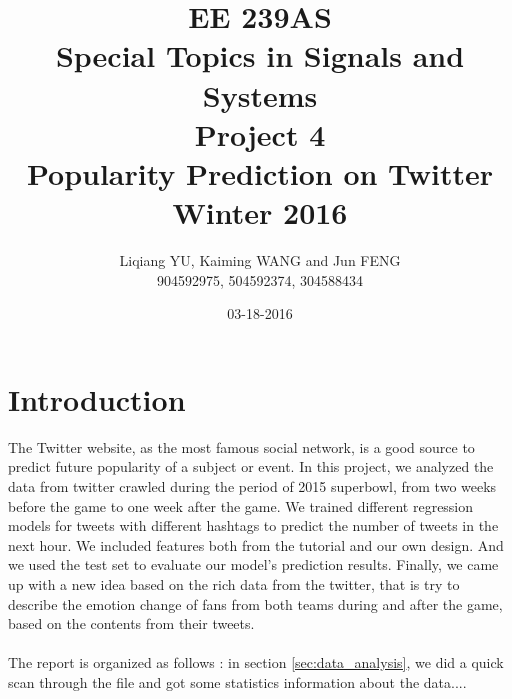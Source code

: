 \documentclass{article}
\begin{document}
\begin{titlepage}
\title{EE 239AS \\Special Topics in Signals and Systems\\Project 4\\Popularity Prediction on Twitter\\Winter 2016} 
\author{Liqiang YU, Kaiming WANG and Jun FENG\\
904592975, 504592374, 304588434} 
\date{03-18-2016}
\end{titlepage}

\maketitle
\newpage
\tableofcontents
\newpage

\section{Introduction}
The Twitter website, as the most famous social network, is a good source to predict future popularity of a subject or event. In this project, we analyzed the data from twitter crawled during the period of 2015 superbowl, from two weeks before the game to one week after the game. We trained different regression models for tweets with different hashtags to predict the number of tweets in the next hour. We included features both from the tutorial and our own design. And we used the test set to evaluate our model's prediction results. Finally, we came up with a new idea based on the rich data from the twitter, that is try to describe the emotion change of fans from both teams during and after the game, based on the contents from their tweets.\\
\\
The report is organized as follows : in section \ref{sec:data_analysis}, we did a quick scan through the file and got some statistics information about the data....
\end{document}
